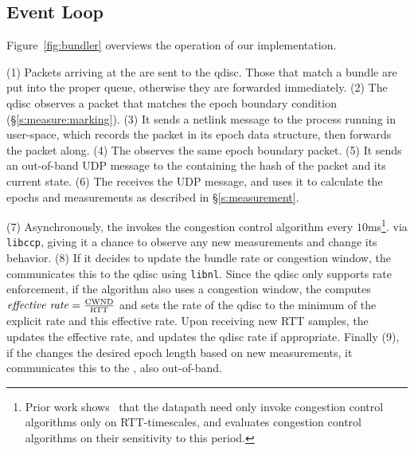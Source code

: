\subsection{\name Event Loop}\label{s:impl:loop}
Figure~\ref{fig:bundler} overviews the operation of our \name implementation.

(1) Packets arriving at the \inbox are sent to the qdisc. Those that match a bundle are put into the proper queue, 
otherwise they are forwarded immediately. (2) The qdisc observes a packet that matches the epoch boundary
condition (\S\ref{s:measure:marking}). (3) It sends a netlink message to the \inbox process running in user-space, which records the packet
in its epoch data structure, then forwards the packet along. (4) The \outbox observes the same epoch boundary
packet. (5) It sends an out-of-band UDP message to the \inbox containing the hash of the packet and its current state. 
(6) The \inbox receives the UDP message, and uses it to calculate the epochs and measurements as described 
in \S\ref{s:measurement}.

(7) Asynchronously, the \inbox invokes the congestion control algorithm every $10$ms\footnote{Prior work shows~\cite{ccp} that the datapath need only invoke congestion control algorithms only on RTT-timescales, and evaluates congestion control algorithms on their sensitivity to this period.}.
via \texttt{libccp},
giving it a chance to observe any new measurements and change its behavior. (8) If it decides to update
the bundle rate or congestion window, the \inbox communicates this to the qdisc
using \texttt{libnl}. Since the qdisc only supports rate enforcement, if the algorithm
also uses a congestion window, the \inbox computes $\text{\emph{effective rate}} = \frac{\text{CWND}}{\text{RTT}}$
and sets the rate of the qdisc to the minimum of the explicit rate and this effective rate.
Upon receiving new RTT samples, the \inbox updates the effective rate, and updates the qdisc rate if appropriate.
Finally (9), if the \inbox changes the desired epoch length based on new measurements, it communicates this to the \outbox, also out-of-band.


